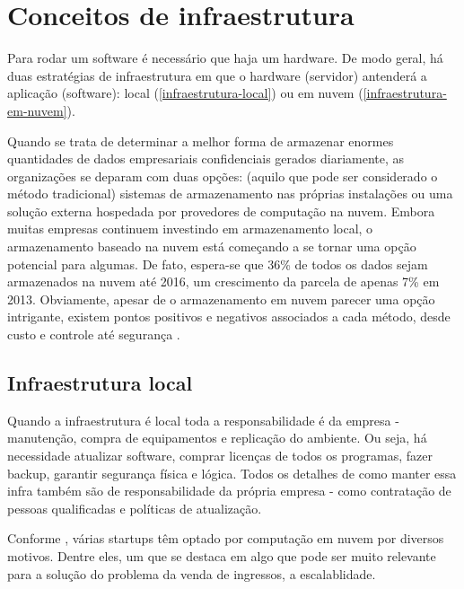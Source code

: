 \chapter{Conceitos de infraestrutura}

Para rodar um software é necessário que haja um hardware. De modo geral,
há duas estratégias de infraestrutura em que o hardware (servidor) antenderá a aplicação (software):
local (\autoref{infraestrutura-local}) ou em nuvem (\autoref{infraestrutura-em-nuvem}).

\begin{citacao}

Quando se trata de determinar a melhor forma de armazenar enormes quantidades de
dados empresariais confidenciais gerados diariamente, as organizações se deparam
com duas opções: (aquilo que pode ser considerado o método tradicional) sistemas
de armazenamento nas próprias instalações ou uma solução externa hospedada por
provedores de computação na nuvem. Embora muitas empresas continuem investindo
em armazenamento local, o armazenamento baseado na nuvem está começando a se
tornar uma opção potencial para algumas. De fato, espera-se que 36\% de todos
os dados sejam armazenados na nuvem até 2016, um crescimento da parcela de
apenas 7\% em 2013. Obviamente, apesar de o armazenamento em nuvem parecer
uma opção intrigante, existem pontos positivos e negativos associados a cada
método, desde custo e controle até segurança \cite{armazenamento-no-local-ou-na-nuvem}.

\end{citacao}

\section{Infraestrutura local}\label{infraestrutura-local}

Quando a infraestrutura é local toda a responsabilidade é da empresa - manutenção,
compra de equipamentos e replicação do ambiente.
Ou seja, há necessidade atualizar software, comprar licenças de todos os programas,
fazer backup, garantir segurança física e lógica.
Todos os detalhes de como manter essa infra também são de responsabilidade da própria empresa -
como contratação de pessoas qualificadas e políticas de atualização.

Conforme \cite{beneficios-da-computacao-em-nuvem-para-sua-startup}, várias startups
têm optado por computação em nuvem por diversos motivos. Dentre eles, um que se destaca
em algo que pode ser muito relevante para a solução do problema da venda de ingressos, 
a escalablidade.

